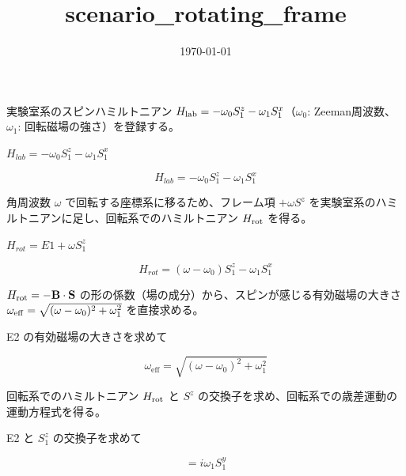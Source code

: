 \documentclass[dvipdfmx,a4paper,11pt]{jsarticle}
\title{scenario\_rotating\_frame}
\date{\today}
\begin{document}
\maketitle

実験室系のスピンハミルトニアン $H_{\rm lab}=-\omega_0S^z_1-\omega_1S^x_1$（$\omega_0$: Zeeman周波数、$\omega_1$: 回転磁場の強さ）を登録する。

$H_{lab} = -\omega_0 S^z_1 - \omega_1 S^x_1$

\begin{equation}
  H_{lab} = -\omega_0 S^{z}_{1} - \omega_1 S^{x}_{1}
  \label{eq:E1}
\end{equation}

角周波数 $\omega$ で回転する座標系に移るため、フレーム項 $+\omega S^z$ を実験室系のハミルトニアンに足し、回転系でのハミルトニアン $H_{\rm rot}$ を得る。

$H_{rot} = E1 + \omega S^z_1$

\begin{equation}
  H_{rot} = \left( \omega - \omega_0 \right) S^{z}_{1} - \omega_1 S^{x}_{1}
  \label{eq:E2}
\end{equation}

$H_{\rm rot}=-\mathbf B\cdot\mathbf S$ の形の係数（場の成分）から、スピンが感じる有効磁場の大きさ $\omega_{\rm eff}=\sqrt{(\omega-\omega_0)^2+\omega_1^2}$ を直接求める。

E2 の有効磁場の大きさを求めて

\begin{equation}
  \omega_{\mathrm{eff}} = \sqrt{ \left(\omega - \omega_0\right)^2 + \omega_1^2 }
  \label{eq:E3}
\end{equation}

回転系でのハミルトニアン $H_{\rm rot}$ と $S^z$ の交換子を求め、回転系での歳差運動の運動方程式を得る。

E2 と $S^z_1$ の交換子を求めて

\begin{equation}
  [H_{rot}, S^z_1] = i \omega_1 S^{y}_{1}
  \label{eq:E4}
\end{equation}
\end{document}
